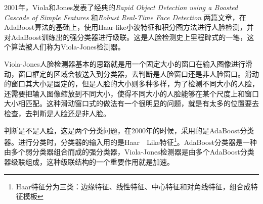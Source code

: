 2001年，Viola和Jones发表了经典的\textit{Rapid Object Detection using a Boosted Cascade of Simple Features} \cite{repid}和\textit{Robust Real-Time Face Detection} \cite{robust}两篇文章，在AdaBoost算法的基础上，使用Haar-like小波特征和积分图方法进行人脸检测，并对AdaBoost训练出的强分类器进行级联。这是人脸检测史上里程碑式的一笔，这个算法被人们称为Viola-Jones检测器。

Viola-Jones人脸检测器基本的思路就是用一个固定大小的窗口在输入图像进行滑动，窗口框定的区域会被送入到分类器，去判断是人脸窗口还是非人脸窗口。滑动的窗口其大小是固定的，但是人脸的大小则多种多样，为了检测不同大小的人脸，还需要把输入图像缩放到不同大小，使得不同大小的人脸能够在某个尺度上和窗口大小相匹配。这种滑动窗口式的做法有一个很明显的问题，就是有太多的位置要去检查，去判断是人脸还是非人脸。

判断是不是人脸，这是两个分类问题，在2000年的时候，采用的是AdaBoost分类器。进行分类时，分类器的输入用的是Haar　Like特征\footnote{Haar特征分为三类：边缘特征、线性特征、中心特征和对角线特征，组合成特征模板}。AdaBoost分类器是一种由多个弱分类器组合而成的强分类器，Viola-Jones检测器是由多个AdaBoost分类器级联组成，这种级联结构的一个重要作用就是加速。